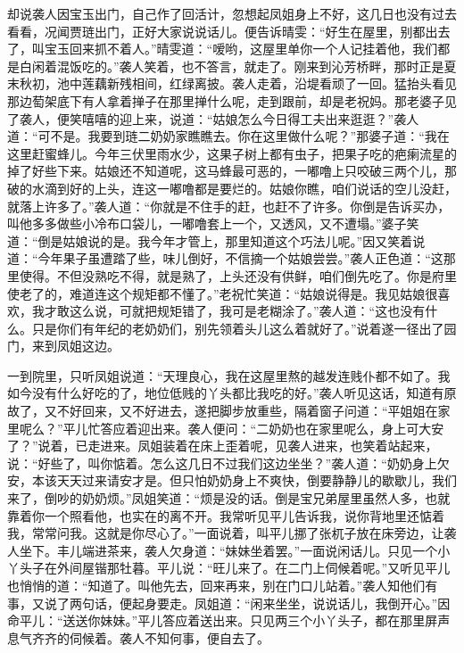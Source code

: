 \documentclass[12pt,oneside]{book}
\begin{document}
却说袭人因宝玉出门，自己作了回活计，忽想起凤姐身上不好，这几日也没有过去看看，况闻贾琏出门，正好大家说说话儿。便告诉晴雯：“好生在屋里，别都出去了，叫宝玉回来抓不着人。”晴雯道：“嗳哟，这屋里单你一个人记挂着他，我们都是白闲着混饭吃的。”袭人笑着，也不答言，就走了。刚来到沁芳桥畔，那时正是夏末秋初，池中莲藕新残相间，红绿离披。袭人走着，沿堤看顽了一回。猛抬头看见那边萄架底下有人拿着掸子在那里掸什么呢，走到跟前，却是老祝妈。那老婆子见了袭人，便笑嘻嘻的迎上来，说道：“姑娘怎么今日得工夫出来逛逛？”袭人道：“可不是。我要到琏二奶奶家瞧瞧去。你在这里做什么呢？”那婆子道：“我在这里赶蜜蜂儿。今年三伏里雨水少，这果子树上都有虫子，把果子吃的疤瘌流星的掉了好些下来。姑娘还不知道呢，这马蜂最可恶的，一嘟噜上只咬破三两个儿，那破的水滴到好的上头，连这一嘟噜都是要烂的。姑娘你瞧，咱们说话的空儿没赶，就落上许多了。”袭人道：“你就是不住手的赶，也赶不了许多。你倒是告诉买办，叫他多多做些小冷布口袋儿，一嘟噜套上一个，又透风，又不遭塌。”婆子笑道：“倒是姑娘说的是。我今年才管上，那里知道这个巧法儿呢。”因又笑着说道：“今年果子虽遭踏了些，味儿倒好，不信摘一个姑娘尝尝。”袭人正色道：“这那里使得。不但没熟吃不得，就是熟了，上头还没有供鲜，咱们倒先吃了。你是府里使老了的，难道连这个规矩都不懂了。”老祝忙笑道：“姑娘说得是。我见姑娘很喜欢，我才敢这么说，可就把规矩错了，我可是老糊涂了。”袭人道：“这也没有什么。只是你们有年纪的老奶奶们，别先领着头儿这么着就好了。”说着遂一径出了园门，来到凤姐这边。

一到院里，只听凤姐说道：“天理良心，我在这屋里熬的越发连贱仆都不如了。我如今没有什么好吃的了，地位低贱的丫头都比我吃的好。”袭人听见这话，知道有原故了，又不好回来，又不好进去，遂把脚步放重些，隔着窗子问道：“平姐姐在家里呢么？”平儿忙答应着迎出来。袭人便问：“二奶奶也在家里呢么，身上可大安了？”说着，已走进来。凤姐装着在床上歪着呢，见袭人进来，也笑着站起来，说：“好些了，叫你惦着。怎么这几日不过我们这边坐坐？”袭人道：“奶奶身上欠安，本该天天过来请安才是。但只怕奶奶身上不爽快，倒要静静儿的歇歇儿，我们来了，倒吵的奶奶烦。”凤姐笑道：“烦是没的话。倒是宝兄弟屋里虽然人多，也就靠着你一个照看他，也实在的离不开。我常听见平儿告诉我，说你背地里还惦着我，常常问我。这就是你尽心了。”一面说着，叫平儿挪了张杌子放在床旁边，让袭人坐下。丰儿端进茶来，袭人欠身道：“妹妹坐着罢。”一面说闲话儿。只见一个小丫头子在外间屋锴那牡暮。平儿说：“旺儿来了。在二门上伺候着呢。”又听见平儿也悄悄的道：“知道了。叫他先去，回来再来，别在门口儿站着。”袭人知他们有事，又说了两句话，便起身要走。凤姐道：“闲来坐坐，说说话儿，我倒开心。”因命平儿：“送送你妹妹。”平儿答应着送出来。只见两三个小丫头子，都在那里屏声息气齐齐的伺候着。袭人不知何事，便自去了。
\end{document}
